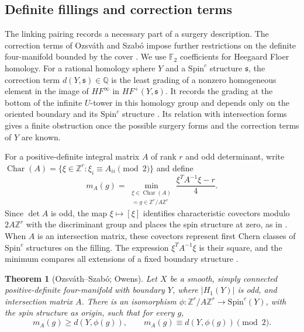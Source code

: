 \documentclass[12pt, oneside]{amsart}
\newtheorem{theorem}{Theorem}[section]
\newcommand{\bbz}{{\mathbb Z}}
\newcommand{\bbq}{{\mathbb Q}}
\begin{document}
\subsection{Definite fillings and correction terms}

The linking pairing records a necessary part of a surgery description. The correction
terms of Ozsv\'ath and Szab\'o impose further restrictions on the definite four-manifold
bounded by the cover \cite{OS03}. We use $\mathbb F_2$ coefficients for Heegaard Floer
homology. For a rational homology sphere $Y$ and a
$\mathrm{Spin}^c$ structure $\mathfrak s$, the correction term
$d(Y,\mathfrak s)\in\bbq$ is the least grading of a nonzero homogeneous element in the
image of $HF^\infty$ in $HF^+(Y,\mathfrak s)$. It records the grading at the bottom of
the infinite $U$-tower in this homology group and depends only on the oriented boundary
and its $\mathrm{Spin}^c$ structure \cite[\S4]{OS03}. Its relation with intersection
forms gives a finite obstruction once the possible surgery forms and the correction
terms of $Y$ are known.

For a positive-definite integral matrix $A$ of rank $r$ and odd determinant, write
$\operatorname{Char}(A)=\{\xi\in\bbz^r:\xi_i\equiv A_{ii}\pmod2\}$ and define
\begin{equation}\label{eq:m-form}
    m_A(g)=\min_{\substack{\xi\in\operatorname{Char}(A)\\
                          [\xi]=g\in\bbz^r/A\bbz^r}}
             \frac{\xi^TA^{-1}\xi-r}{4}.
\end{equation}
Since $\det A$ is odd, the map $\xi\mapsto[\xi]$ identifies characteristic covectors
modulo $2A\bbz^r$ with the discriminant group and places the spin structure at zero,
as in \cite[\S4]{Owens}. When $A$ is an intersection matrix, these covectors represent
first Chern classes of $\mathrm{Spin}^c$ structures on the filling. The expression
$\xi^TA^{-1}\xi$ is their square, and the minimum compares all extensions of a fixed
boundary structure \cite[\S4]{Owens}.

\begin{theorem}[Ozsv\'ath--Szab\'o; Owens]\label{thm:dmatch}
Let $X$ be a smooth, simply connected positive-definite four-manifold with boundary $Y$,
where $|H_1(Y)|$ is odd, and intersection matrix $A$. There is an isomorphism
$\phi:\bbz^r/A\bbz^r\longrightarrow\mathrm{Spin}^c(Y)$, with the spin structure as
origin, such that for every $g$,
\begin{equation}\label{eq:dmatch}
    m_A(g)\ge d(Y,\phi(g)),\qquad
    m_A(g)\equiv d(Y,\phi(g))\pmod2.
\end{equation}
\end{theorem}
\end{document}
